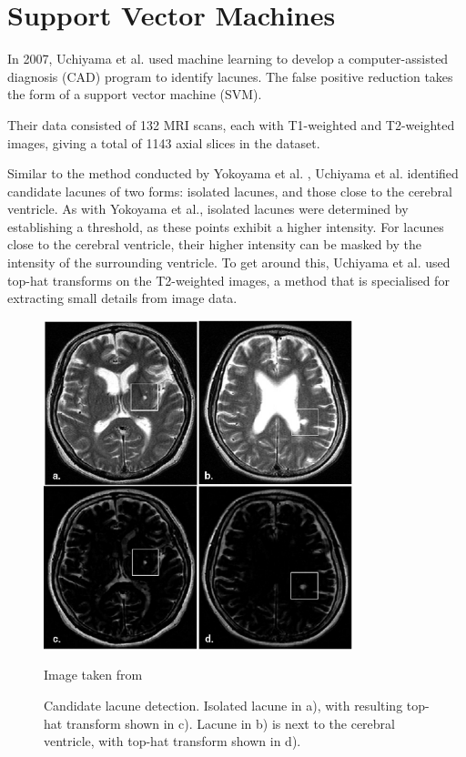 \section{Support Vector Machines}

In 2007, Uchiyama et al. \cite{Uchiyama20071554} used machine learning to develop a computer-assisted diagnosis (CAD) program to identify lacunes. The false positive reduction takes the form of a support vector machine (SVM).

Their data consisted of 132 MRI scans, each with T1-weighted and T2-weighted images, giving a total of 1143 axial slices in the dataset. 

Similar to the method conducted by Yokoyama et al. \cite{Yokoyama2007}, Uchiyama et al. identified candidate lacunes of two forms: isolated lacunes, and those close to the cerebral ventricle. As with Yokoyama et al., isolated lacunes were determined by establishing a threshold, as these points exhibit a higher intensity. For lacunes close to the cerebral ventricle, their higher intensity can be masked by the intensity of the surrounding ventricle. To get around this, Uchiyama et al. used top-hat transforms on the T2-weighted images, a method that is specialised for extracting small details from image data.

\begin{figure}[ht]
	\centering
	\includegraphics[width=0.8\textwidth]{Images/4_uchiyama_candidates.png}
	\caption{Candidate lacune detection. Isolated lacune in a), with resulting top-hat transform shown in c). Lacune in b) is next to the cerebral ventricle, with top-hat transform shown in d).}
	\small Image taken from \cite{Uchiyama20071554}
\end{figure}

